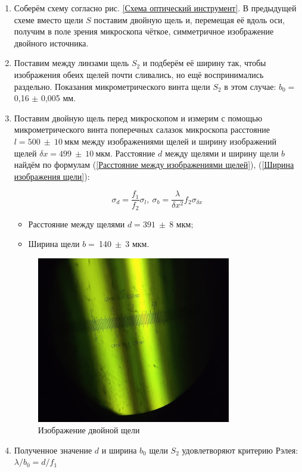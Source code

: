 \documentclass[a4paper, 12pt]{article}
\begin{document}
\begin{enumerate}
	\item Соберём схему согласно рис. \ref{Схема оптический инструмент}. В предыдущей схеме вместо щели $S$ поставим двойную щель и, перемещая её вдоль оси, получим в поле зрения микроскопа чёткое, симметричное изображение двойного источника.

	\item Поставим между линзами щель $S_2$ и подберём её ширину так, чтобы изображения обеих щелей почти сливались, но ещё воспринимались раздельно. Показания микрометрического винта щели $S_2$ в этом случае: $b_0 = ~$0,16 $\pm$ 0,005 мм.

	\item Поставим двойную щель перед микроскопом и измерим с помощью микрометрического винта поперечных салазок микроскопа расстояние $l = 500~\pm~10~$мкм между изображениями щелей и ширину изображений щелей $\delta x = 499~\pm~10~$мкм. Расстояние $d$ между щелями и ширину щели $b$ найдём по формулам (\ref{Расстояние между изображениями щелей}), (\ref{Ширина изображения щели}):

	\[\sigma_d = \dfrac{f_1}{f_2}\sigma_l,~\sigma_b = \dfrac{\lambda}{\delta x^2}f_2 \sigma_{\delta x}\]

	\begin{itemize}
		\item Расстояние между щелями $d = 391~\pm~8$ мкм;
		\item Ширина щели $b =~$140$~\pm~3$ мкм.
	\end{itemize}

	\begin{figure}[h!]
		\centering
		\includegraphics[width=0.8\textwidth]{Dual_source.jpg}
		\caption{Изображение двойной щели}
	\end{figure}

	\item Полученное значение $d$ и ширина $b_0$ щели $S_2$ удовлетворяют критерию Рэлея: $\lambda/b_0 = d/f_1$

\end{enumerate}
\end{document}
